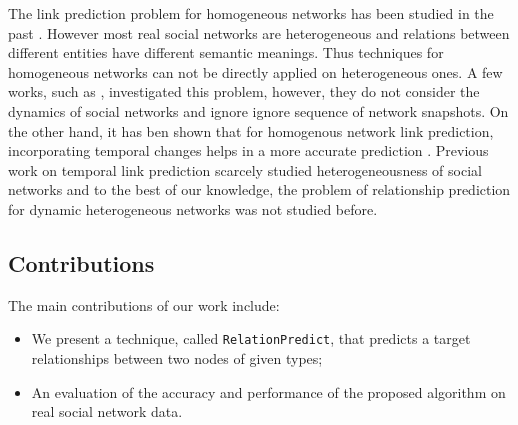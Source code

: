 
The link prediction problem for homogeneous networks has been studied in the past \cite{liben2007link}. However most real social networks are heterogeneous and relations between different entities have different semantic meanings. Thus techniques for homogeneous networks can not be directly applied on heterogeneous ones. A few works, such as \cite{sun2011pathsim,sun2011ASONAM}, investigated this problem, however, they do not consider the dynamics of social networks and ignore ignore sequence of network snapshots. On the other hand, it has ben shown that for homogenous network link prediction, incorporating temporal changes helps in a more accurate prediction \cite{Zhu2016}. Previous work on temporal link prediction scarcely studied heterogeneousness of social networks and to the best of our knowledge, the problem of relationship prediction for dynamic heterogeneous networks was not studied before.


\subsection{Contributions}

The main contributions of our work include:

\begin{itemize}

\item We present a technique, called \texttt{RelationPredict}, that predicts a target relationships between two nodes of given types;

\item An evaluation of the accuracy and performance of the proposed algorithm on real social network data.

\end{itemize}


